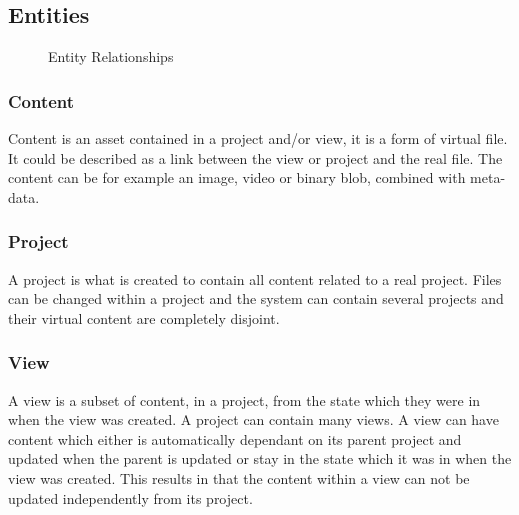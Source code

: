 \documentclass[a4paper,12pt]{article}
\begin{document}
\subsection{Entities}
\begin{figure}[htp] 
    \caption{Entity Relationships}
    \label{fig:relation}
\end{figure}

\subsubsection{Content}
Content is an asset contained in a project and/or view, it is a form of virtual file.
It could be described as a link between the view or project and the real file. 
    The content can be for example an image, video or binary blob, combined with meta-data.

\subsubsection{Project}
A project is what is created to contain all content related to a real project. Files can be changed within a project and 
the system can contain several projects and their virtual content are completely disjoint.

\subsubsection{View}
A view is a subset of content, in a project, from the state which they were in when the view was created. A project can 
contain many views. A view can have content which either is automatically dependant on its parent project and updated 
when the parent is updated or stay in the state which it was in when the view was created. This results in that the content 
within a view can not be updated independently from its project.
\end{document}
